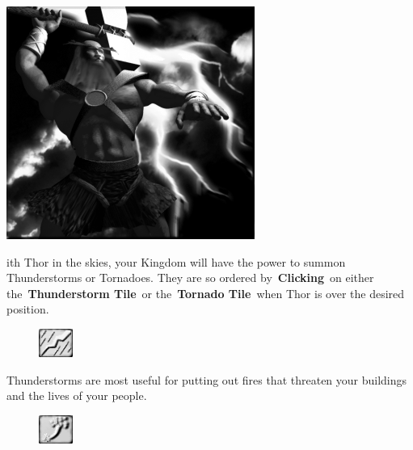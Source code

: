 
\begin{center}
	\includegraphics[width=.9\linewidth]{Athor}
\end{center}

ith Thor in the skies, your Kingdom will have the power to summon Thunderstorms or Tornadoes. They are so ordered by \textbf{Clicking} on either the \textbf{Thunderstorm Tile} or the \textbf{Tornado Tile} when Thor is over the desired position.

\begin{figure}
	\vspace{-20pt}
	\begin{center}
		\includegraphics[width=0.1\textwidth]{Train}
	\end{center}
	\vspace{-20pt}
\end{figure}

Thunderstorms are most useful for putting out fires that threaten your buildings and the lives of your people. \\

\begin{figure}
	\vspace{-20pt}
	\begin{center}
		\includegraphics[width=0.1\textwidth]{Ttornedo}
	\end{center}
	\vspace{-20pt}
\end{figure}

